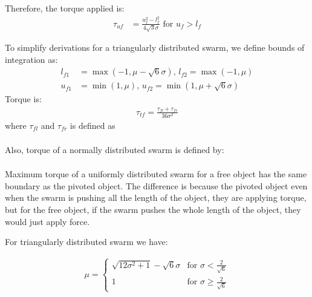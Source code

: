 Therefore, the torque applied is:
\begin{align}
\tau_{uf} &= \frac{u_f^2-l_f^2}{4\sqrt{3}\sigma} \textrm{  for    }  u_f>l_f
\end{align}

To simplify derivations for a triangularly distributed swarm, we define bounds of integration as:
\begin{align}
l_{f1} &= \max({-1,\mu-\sqrt{6}\sigma}), \,l_{f2} = \max({-1,\mu})\\ \nonumber
u_{f1} &= \min({1,\mu}), \, u_{f2} = \min({1,\mu+\sqrt{6}\sigma}) \nonumber
\end{align}
Torque is:
\begin{align}
\tau_{tf} = \frac{\tau_{fl}+ \tau_{fr}}{36\sigma^2}
\end{align}
where $\tau_{fl}$ and $\tau_{fr}$ is defined as
\begin{align}\nonumber
\end{align}

Also, torque of a normally distributed swarm is defined by:
\begin{align} \nonumber
\end{align}

Maximum torque of a uniformly distributed swarm for a free object has the same boundary as the pivoted object. The difference is because the pivoted object even when the swarm is pushing all the length of the object, they are applying torque, but for the free object, if the swarm pushes the whole length of the object, they would just apply force.

For triangularly distributed swarm we have:

\begin{align}
\mu= \left\{
\begin{array}{ll}
 \sqrt{12\sigma^2 +1}  -\sqrt{6}\sigma &   \textrm{for     }  \sigma  <\frac{2}{\sqrt{6}} \\
1 &   \textrm{for     } \sigma \geq \frac{2}{\sqrt{6}} 
\end{array} 
\right.
\end{align}


